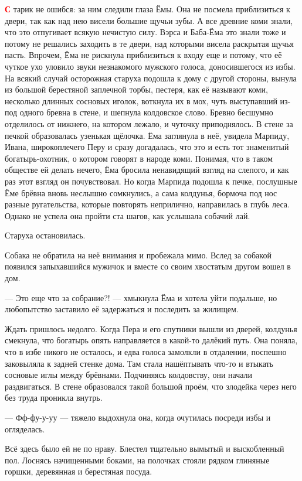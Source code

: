 \documentclass[oneside,final,14pt]{extreport}
\begin{document}
	\lettrine[findent=0pt]{\textbf{\textcolor{red}{С}}}{} тарик не ошибся: за ним следили глаза Ёмы. Она не посмела приблизиться к двери, так как над нею висели большие щучьи зубы. А все древние коми знали, что это отпугивает всякую нечистую силу. Вэрса и Баба-Ёма это знали тоже и потому не решались заходить в те двери, над которыми висела раскрытая щучья пасть. Впрочем, Ёма не рискнула приблизиться к входу еще и потому, что её чуткое ухо уловило звуки незнакомого мужского голоса, доносившегося из избы. На всякий случай осторожная старуха подошла к дому с другой стороны, вынула из большой берестяной заплечной торбы, пестеря, как её называют коми, несколько длинных сосновых иголок, воткнула их в мох, чуть выступавший из-под одного бревна в стене, и шепнула колдовское слово. Бревно бесшумно отделилось от нижнего, на котором лежало, и чуточку приподнялось. В стене за печкой образовалась узенькая щёлочка. Ёма заглянула в неё, увидела Марпиду, Ивана, широкоплечего Перу и сразу догадалась, что это и есть тот знаменитый богатырь-охотник, о котором говорят в народе коми. Понимая, что в таком обществе ей делать нечего, Ёма бросила ненавидящий взгляд на слепого, и как раз этот взгляд он почувствовал. Но когда Марпида подошла к печке, послушные Ёме брёвна вновь неслышно сомкнулись, а сама колдунья, бормоча под нос разные ругательства, которые повторять неприлично, направилась в глубь леса. Однако не успела она пройти ста шагов, как услышала собачий лай.
	
	Старуха остановилась.
	
	Собака не обратила на неё внимания и пробежала мимо. Вслед за собакой появился запыхавшийся мужичок и вместе со своим хвостатым другом вошел в дом.
	
	— Это еще что за собрание?! — хмыкнула Ёма и хотела уйти подальше, но любопытство заставило её задержаться и последить за жилищем.
	
	Ждать пришлось недолго. Когда Пера и его спутники вышли из дверей, колдунья смекнула, что богатырь опять направляется в какой-то далёкий путь. Она поняла, что в избе никого не осталось, и едва голоса замолкли в отдалении, поспешно заковыляла к задней стенке дома. Там стала нашёптывать что-то и втыкать сосновые иглы между брёвнами. Подчиняясь колдовству, они начали раздвигаться. В стене образовался такой большой проём, что злодейка через него без труда проникла внутрь.
	
	— Фф-фу-у-уу — тяжело выдохнула она, когда очутилась посреди избы и огляделась.
	
	Всё здесь было ей не по нраву. Блестел тщательно вымытый и выскобленный пол. Лоснясь начищенными боками, на полочках стояли рядком глиняные горшки, деревянная и берестяная посуда.
	
\end{document}
